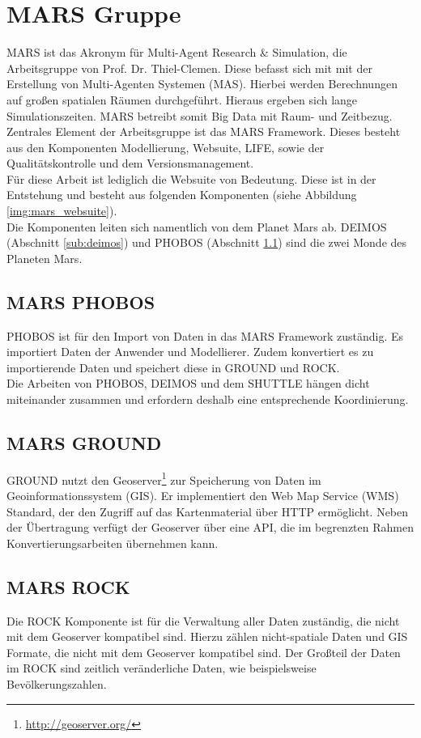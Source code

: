 \documentclass[10pt,conference,compsocconf]{IEEEtran}
\begin{document}
\section{MARS Gruppe}
MARS ist das Akronym für Multi-Agent Research \& Simulation, die Arbeitsgruppe von Prof. Dr. Thiel-Clemen. Diese befasst sich mit mit der Erstellung von Multi-Agenten Systemen (MAS). Hierbei werden Berechnungen auf großen spatialen Räumen durchgeführt. Hieraus ergeben sich lange Simulationszeiten. MARS betreibt somit Big Data mit Raum- und Zeitbezug.\\
Zentrales Element der Arbeitsgruppe ist das MARS Framework. Dieses besteht aus den Komponenten Modellierung, Websuite, LIFE, sowie der Qualitätskontrolle und dem Versionsmanagement.\\
Für diese Arbeit ist lediglich die Websuite von Bedeutung. Diese ist in der Entstehung und besteht aus folgenden Komponenten (siehe Abbildung \ref{img:mars_websuite}).\\
Die Komponenten leiten sich namentlich von dem Planet Mars ab. DEIMOS (Abschnitt \ref{sub:deimos}) und PHOBOS (Abschnitt \ref{sub:phobos}) sind die zwei Monde des Planeten Mars.

\subsection{MARS PHOBOS}
\label{sub:phobos}
PHOBOS ist für den Import von Daten in das MARS Framework zuständig. Es importiert Daten der Anwender und Modellierer. Zudem konvertiert es zu importierende Daten und speichert diese in GROUND und ROCK.\\
Die Arbeiten von PHOBOS, DEIMOS und dem SHUTTLE hängen dicht miteinander zusammen und erfordern deshalb eine entsprechende Koordinierung.

\subsection{MARS GROUND}
GROUND nutzt den Geoserver\footnote{\url{http://geoserver.org/}} zur Speicherung von Daten im Geoinformationssystem (GIS). Er implementiert den Web Map Service (WMS) Standard, der den Zugriff auf das Kartenmaterial über HTTP ermöglicht. Neben der Übertragung verfügt der Geoserver über eine API, die im begrenzten Rahmen Konvertierungsarbeiten übernehmen kann.

\subsection{MARS ROCK}
Die ROCK Komponente ist für die Verwaltung aller Daten zuständig, die nicht mit dem Geoserver kompatibel sind. Hierzu zählen nicht-spatiale Daten und GIS Formate, die nicht mit dem Geoserver kompatibel sind. Der Großteil der Daten im ROCK sind zeitlich veränderliche Daten, wie beispielsweise Bevölkerungszahlen.
\end{document}
